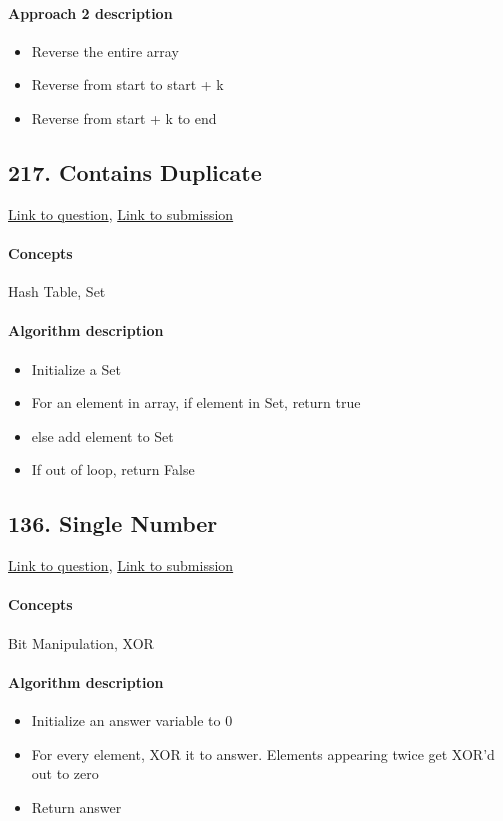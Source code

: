 \documentclass[11pt]{book}
\begin{document}
\paragraph{Approach 2 description}
\begin{itemize}
    \item Reverse the entire array
    \item Reverse from start to start + k
    \item Reverse from start + k to end
\end{itemize}

\subsection{217. Contains Duplicate}
\href{https://leetcode.com/problems/contains-duplicate/}{Link to question},
\href{https://leetcode.com/submissions/detail/333069819/}{Link to submission}
\paragraph{Concepts}
Hash Table, Set
\paragraph{Algorithm description}
\begin{itemize}
    \item Initialize a Set
    \item For an element in array, if element in Set, return true
    \item else add element to Set
    \item If out of loop, return False
\end{itemize}
 
\subsection{136. Single Number}
\href{https://leetcode.com/problems/single-number/}{Link to question},
\href{https://leetcode.com/submissions/detail/333115980/}{Link to submission}
\paragraph{Concepts}
Bit Manipulation, XOR
\paragraph{Algorithm description}
\begin{itemize}
    \item Initialize an answer variable to 0
    \item For every element, XOR it to answer. Elements appearing twice get XOR'd out to zero
    \item Return answer
\end{itemize}
\end{document}
